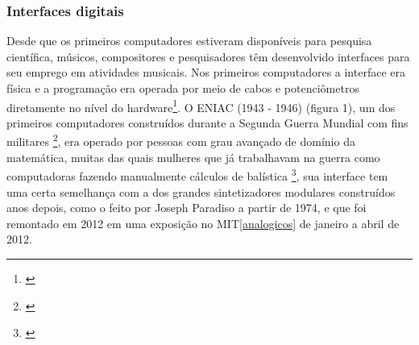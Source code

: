 






\subsubsection{Interfaces digitais}

Desde que os primeiros computadores estiveram disponíveis para pesquisa científica, músicos, compositores e pesquisadores têm desenvolvido interfaces para seu emprego em atividades musicais. Nos primeiros computadores a interface era física e a programação era operada por meio de cabos e potenciômetros diretamente no nível do hardware\footnote{\cite[p. 110]{Henrique1996}}. O ENIAC (1943 - 1946) (figura 1), um dos primeiros computadores construídos durante a Segunda Guerra Mundial com fins militares \footnote{\cite[p. 24]{Stolfi}}, era operado por pessoas com grau avançado de domínio da matemática, muitas das quais mulheres que já trabalhavam na guerra como computadoras fazendo manualmente cálculos de balística \footnote{\cite{HayleyWilliams2015}}, sua interface tem uma certa semelhança com a dos grandes sintetizadores modulares construídos anos depois, como o feito por Joseph Paradiso a partir de 1974, e que foi remontado em 2012 em uma exposição no MIT\ref{analogicos} de janeiro a abril de 2012. 

